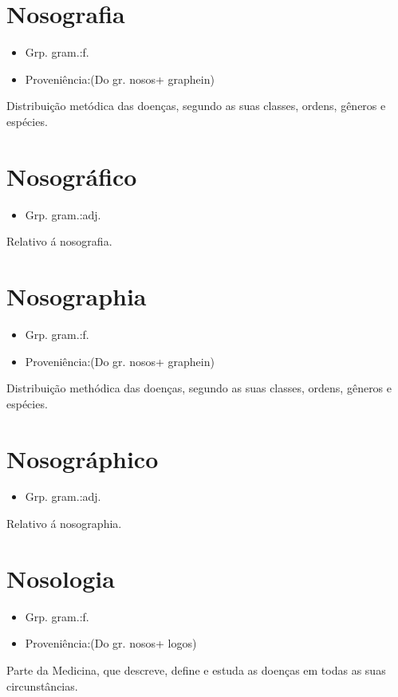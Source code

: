 \section{Nosografia}
\begin{itemize}
\item {Grp. gram.:f.}
\end{itemize}
\begin{itemize}
\item {Proveniência:(Do gr. \textunderscore nosos\textunderscore  + \textunderscore graphein\textunderscore )}
\end{itemize}
Distribuição metódica das doenças, segundo as suas classes, ordens, gêneros e espécies.
\section{Nosográfico}
\begin{itemize}
\item {Grp. gram.:adj.}
\end{itemize}
Relativo á nosografia.
\section{Nosographia}
\begin{itemize}
\item {Grp. gram.:f.}
\end{itemize}
\begin{itemize}
\item {Proveniência:(Do gr. \textunderscore nosos\textunderscore  + \textunderscore graphein\textunderscore )}
\end{itemize}
Distribuição methódica das doenças, segundo as suas classes, ordens, gêneros e espécies.
\section{Nosográphico}
\begin{itemize}
\item {Grp. gram.:adj.}
\end{itemize}
Relativo á nosographia.
\section{Nosologia}
\begin{itemize}
\item {Grp. gram.:f.}
\end{itemize}
\begin{itemize}
\item {Proveniência:(Do gr. \textunderscore nosos\textunderscore  + \textunderscore logos\textunderscore )}
\end{itemize}
Parte da Medicina, que descreve, define e estuda as doenças em todas as suas circunstâncias.
